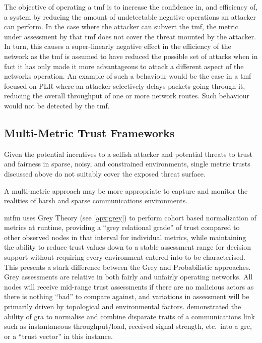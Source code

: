 The objective of operating a \gls{tmf} is to increase the confidence in, and efficiency of, a system by reducing the amount of undetectable negative operations an attacker can perform.
In the case where the attacker can subvert the \gls{tmf}, the metric under assessment by that \gls{tmf} does not cover the threat mounted by the attacker.
In turn, this causes a super-linearly negative effect in the efficiency of the network as the \gls{tmf} is assumed to have reduced the possible set of attacks when in fact it has only made it more advantageous to attack a different aspect of the networks operation.
An example of such a behaviour would be the case in a \gls{tmf} focused on PLR where an attacker selectively delays packets going through it, reducing the overall throughput of one or more network routes.
Such behaviour would not be detected by the \gls{tmf}.

\subsection{Multi-Metric Trust Frameworks}\label{sec:multimetrictrust}
Given the potential incentives to a selfish attacker and potential threats to trust and fairness in sparse, noisy, and constrained environments, single metric trusts discussed above do not suitably cover the exposed threat surface.


A multi-metric approach may be more appropriate to capture and monitor the realities of harsh and sparse communications environments.

\gls{mtfm}\cite{Guo11} uses Grey Theory (see \autoref{apx:grey}) to perform cohort based normalization of metrics at runtime, providing a ``grey relational grade'' of trust compared to other observed nodes in that interval for individual metrics, while maintaining the ability to reduce trust values down to a stable assessment range for decision support without requiring every environment entered into to be characterised.
This presents a stark difference between the Grey and Probabilistic approaches.
Grey assessments are relative in both fairly and unfairly operating networks.
All nodes will receive mid-range trust assessments if there are no malicious actors as there is nothing ``bad'' to compare against, and variations in assessment will be primarily driven by topological and environmental factors.
\citet{Guo11} demonstrated the ability of \gls{gra} to normalise and combine disparate traits of a communications link such as instantaneous throughput/load, received signal strength, etc.\ into a \gls{grc}, or a ``trust vector'' in this instance.

